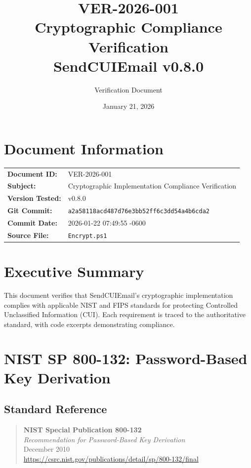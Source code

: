 \documentclass[11pt,letterpaper]{article}
\title{
    \textbf{VER-2026-001} \\
    \Large Cryptographic Compliance Verification \\
    \large SendCUIEmail v0.8.0
}
\author{Verification Document}
\date{January 21, 2026}
\begin{document}
\maketitle

\section*{Document Information}

\begin{tabular}{ll}
\textbf{Document ID:} & VER-2026-001 \\
\textbf{Subject:} & Cryptographic Implementation Compliance Verification \\
\textbf{Version Tested:} & v0.8.0 \\
\textbf{Git Commit:} & \texttt{a2a58118acd487d76e3bb52ff6c3dd54a4b6cda2} \\
\textbf{Commit Date:} & 2026-01-22 07:49:55 -0600 \\
\textbf{Source File:} & \texttt{Encrypt.ps1} \\
\end{tabular}

\section*{Executive Summary}

This document verifies that SendCUIEmail's cryptographic implementation complies with applicable NIST and FIPS standards for protecting Controlled Unclassified Information (CUI). Each requirement is traced to the authoritative standard, with code excerpts demonstrating compliance.

\tableofcontents
\newpage

\section{NIST SP 800-132: Password-Based Key Derivation}

\subsection{Standard Reference}

\begin{quote}
\textbf{NIST Special Publication 800-132} \\
\textit{Recommendation for Password-Based Key Derivation} \\
December 2010 \\
\url{https://csrc.nist.gov/publications/detail/sp/800-132/final}
\end{quote}
\end{document}
